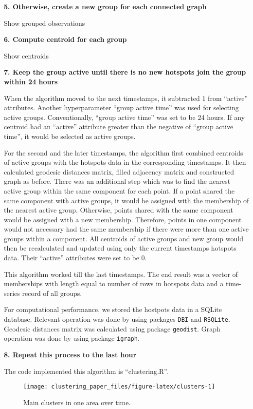 \textbf{5. Otherwise, create a new group for each connected graph}

Show grouped observations

\textbf{6. Compute centroid for each group}

Show centroids

\textbf{7. Keep the group active until there is no new hotspots join the
group within 24 hours}

When the algorithm moved to the next timestamps, it subtracted 1 from
``active'' attributes. Another hyperparameter ``group active time'' was
used for selecting active groups. Conventionally, ``group active time''
was set to be 24 hours. If any centroid had an ``active'' attribute
greater than the negative of ``group active time'', it would be selected
as active groups.

For the second and the later timestamps, the algorithm first combined
centroids of active groups with the hotspots data in the corresponding
timestamps. It then calculated geodesic distances matrix, filled
adjacency matrix and constructed graph as before. There was an
additional step which was to find the nearest active group within the
same component for each point. If a point shared the same component with
active groups, it would be assigned with the membership of the nearest
active group. Otherwise, points shared with the same component would be
assigned with a new membership. Therefore, points in one component would
not necessary had the same membership if there were more than one active
groups within a component. All centroids of active groups and new group
would then be recalculated and updated using only the current timestamps
hotspots data. Their ``active'' attributes were set to be 0.

This algorithm worked till the last timestamps. The end result was a
vector of memberships with length equal to number of rows in hotspots
data and a time-series record of all groups.

For computational performance, we stored the hostpots data in a SQLite
database. Relevant operation was done by using packages \texttt{DBI} and
\texttt{RSQLite}. Geodesic distances matrix was calculated using package
\texttt{geodist}. Graph operation was done by using package
\texttt{igraph}.

\textbf{8. Repeat this process to the last hour}

The code implemented this algorithm is ``clustering.R''.

\begin{Schunk}
\begin{figure}
\texttt{[image: clustering\_paper\_files/figure-latex/clusters-1]} \caption[Main clusters in one area over time]{Main clusters in one area over time.}\label{fig:clusters}
\end{figure}
\end{Schunk}

